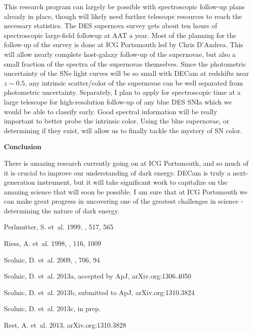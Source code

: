 \documentclass[12pt,preprint]{aastex}
\begin{document}
This research program can largely be possible with spectroscopic follow-up plans already in place, though will likely need further telescope resources to reach the necessary statistics.  The DES supernova survey gets about ten hours of spectroscopic large-field followup at AAT a year.  Most of the planning for the follow-up of the survey is done at ICG Portsmouth led by Chris D'Andrea.  This will allow nearly complete host-galaxy follow-up of the supernovae, but also a small fraction of the spectra of the supernovae themselves.    Since the photometric uncertainty of the SNe light curves will be so small with DECam at redshifts near $z\sim0.5$, any intrinsic scatter/color of the supernovae can be well separated from photometric uncertainty.  Separately, I plan to apply for spectroscopic time at a large telescope for high-resolution follow-up of any blue DES SNIa which we would be able to classify early.  Good spectral information will be really important to better probe the intrinsic color.  Using the blue supernovae, or determining if they exist, will allow us to finally tackle the mystery of SN color.




\textbf{Conclusion}

There is amazing research currently going on at ICG Portsmouth, and so much of it is crucial to improve our understanding of dark energy.  DECam is truly a next-generation instrument, but it will take significant work to capitalize on the amazing science that will soon be possible.  I am sure that at ICG Portsmouth we can make great progress in uncovering one of the greatest challenges in science - determining the nature of dark energy.

Perlmutter, S. {et~al.} 1999, \apj, 517, 565

Riess, A. {et~al.} 1998, \aj, 116, 1009

Scolnic, D. {et~al.} 2009, \apj, 706, 94

Scolnic, D. {et~al.} 2013a, accepted by ApJ, arXiv.org:1306.4050  

Scolnic, D. {et~al.} 2013b, submitted to ApJ, arXiv.org:1310.3824 

Scolnic, D. {et~al.} 2013c, in prep.

Rest, A. {et~al.}  2013, arXiv.org:1310.3828 
\end{document}
